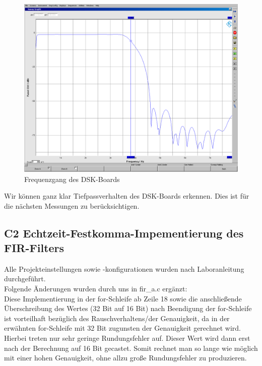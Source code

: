 \begin{figure}[h]
	\centering
	\includegraphics[width=1\linewidth]{Bilder/Attachment_C1_DSK_Frequenzgang}
	\caption{Frequenzgang des DSK-Boards}
	\label{fig:Attachment_C1_DSK_Frequenzgang}
\end{figure}

\noindent Wir können ganz klar Tiefpassverhalten des DSK-Boards erkennen. Dies ist für die nächsten Messungen zu berücksichtigen.

\clearpage

\subsection{C2 Echtzeit-Festkomma-Impementierung des FIR-Filters}
\noindent Alle Projekteinstellungen sowie -konfigurationen wurden nach Laboranleitung durchgeführt.\\
\noindent Folgende Änderungen wurden durch uns in fir\_a.c ergänzt: \\

\noindent Diese Implementierung in der for-Schleife ab Zeile 18 sowie die anschließende Überschreibung des Wertes (32 Bit auf 16 Bit) nach Beendigung der for-Schleife ist vorteilhaft bezüglich des Rauschverhaltens/der Genauigkeit, da in der erwähnten for-Schleife mit 32 Bit zugunsten der Genauigkeit gerechnet wird. Hierbei treten nur sehr geringe Rundungsfehler auf. Dieser Wert wird dann erst nach der Berechnung auf 16 Bit gecastet. Somit rechnet man so lange wie möglich mit einer hohen Genauigkeit, ohne allzu große Rundungsfehler zu produzieren.

